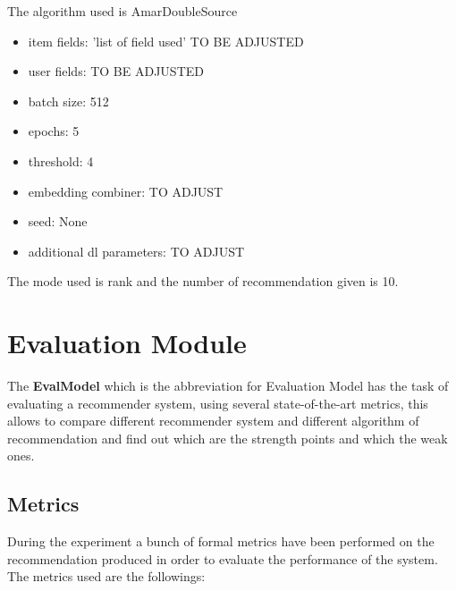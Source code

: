\documentclass[11pt]{article}
\begin{document}
The algorithm used is AmarDoubleSource
\begin{itemize}
    \item item fields: 'list of field used' TO BE ADJUSTED
    \item user fields: TO BE ADJUSTED
    \item batch size: 512
    \item epochs: 5
    \item threshold: 4
    \item embedding combiner: TO ADJUST
    \item seed: None
    \item additional dl parameters: TO ADJUST
\end{itemize}
\hfill\break
\hfill\break
The mode used is rank and the number of recommendation given is
10.
\hfill\break
\hfill\break















\section{Evaluation Module}\label{sec:eva-module}
The \textbf{EvalModel} which is the abbreviation for Evaluation Model has the task of evaluating a recommender system,
using several state-of-the-art metrics, this allows to compare different recommender system and different algorithm of
recommendation and find out which are the strength points and which the weak ones.

\subsection{Metrics}\label{subsec:metrics}
During the experiment a bunch of formal metrics have been performed on the recommendation produced in order to evaluate
the performance of the system.
The metrics used are the followings:
\hfill\break
\hfill\break
\end{document}
